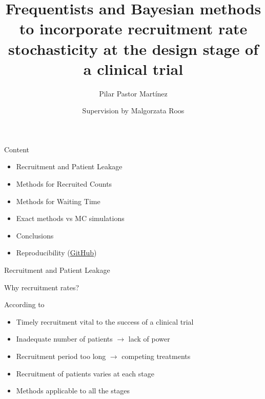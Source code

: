 \documentclass[english]{beamer}\usepackage[]{graphicx}\usepackage[]{xcolor}
\title[Recruitment rate stochasticity
at the design stage of a clinical trial, Master Exam]{Frequentists and Bayesian methods to incorporate
recruitment rate stochasticity
at the design stage of a clinical trial}
\author{Supervision by Malgorzata Roos}
\institute{Biostatistics Master Exam}  %
\subtitle{Pilar Pastor Martínez}
\begin{document}
\maketitle

\begin{frame}{Content}

\begin{itemize}[label = ]
\item Recruitment and Patient Leakage
\item Methods for Recruited Counts
\item Methods for Waiting Time
\item Exact methods vs MC simulations
\item Conclusions
\item Reproducibility (\href{https://github.com/ppasto/masterthesis}{GitHub})
\end{itemize}

\end{frame}

\begin{frame}{Recruitment and Patient Leakage}

\end{frame}

\begin{frame}{Why recruitment rates?}

According to \cite{carter2004application}
\begin{itemize}
\item Timely recruitment vital to the success of a clinical trial
\item Inadequate number of patients $\rightarrow$ lack of power
\item Recruitment period too long $\rightarrow$ competing treatments
\item Recruitment of patients varies at each stage 
\item Methods applicable to all the stages
\end{itemize}

\end{frame}
\end{document}
